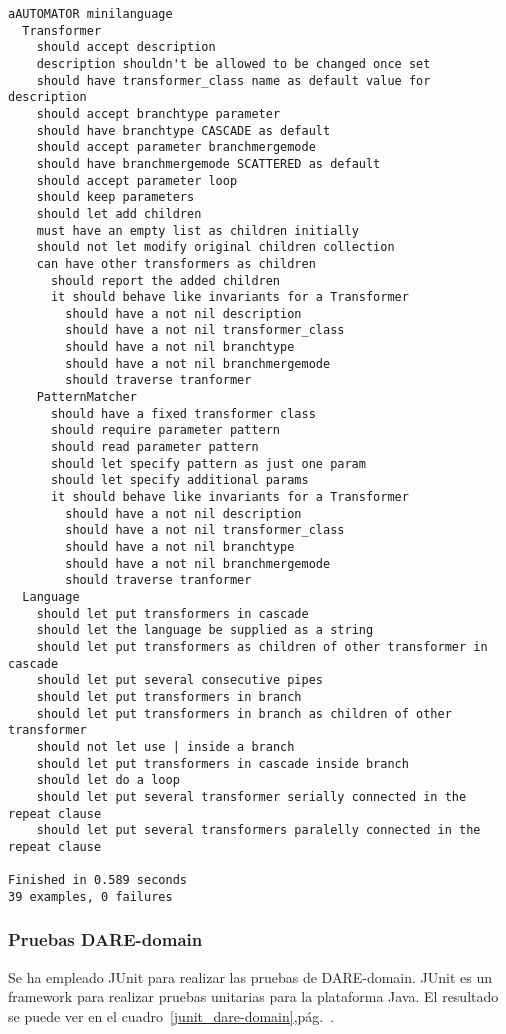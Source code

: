 \begin{table}[hbp]
\begingroup
    \fontsize{9pt}{11pt}\selectfont
\begin{verbatim}
aAUTOMATOR minilanguage
  Transformer
    should accept description
    description shouldn't be allowed to be changed once set
    should have transformer_class name as default value for description
    should accept branchtype parameter
    should have branchtype CASCADE as default
    should accept parameter branchmergemode
    should have branchmergemode SCATTERED as default
    should accept parameter loop
    should keep parameters
    should let add children
    must have an empty list as children initially
    should not let modify original children collection
    can have other transformers as children
      should report the added children
      it should behave like invariants for a Transformer
        should have a not nil description
        should have a not nil transformer_class
        should have a not nil branchtype
        should have a not nil branchmergemode
        should traverse tranformer
    PatternMatcher
      should have a fixed transformer class
      should require parameter pattern
      should read parameter pattern
      should let specify pattern as just one param
      should let specify additional params
      it should behave like invariants for a Transformer
        should have a not nil description
        should have a not nil transformer_class
        should have a not nil branchtype
        should have a not nil branchmergemode
        should traverse tranformer
  Language
    should let put transformers in cascade
    should let the language be supplied as a string
    should let put transformers as children of other transformer in cascade
    should let put several consecutive pipes
    should let put transformers in branch
    should let put transformers in branch as children of other transformer
    should not let use | inside a branch
    should let put transformers in cascade inside branch
    should let do a loop
    should let put several transformer serially connected in the repeat clause
    should let put several transformers paralelly connected in the repeat clause

Finished in 0.589 seconds
39 examples, 0 failures
\end{verbatim}
\endgroup
\caption{RSpec Tests para minilenguaje}
\label{rspec_tests}
\end{table}

\subsubsection{Pruebas DARE-domain}
Se ha empleado JUnit\cite{JUNIT} para realizar las pruebas de
DARE-domain. JUnit es un framework para realizar pruebas unitarias
para la plataforma Java. El resultado se puede ver en el
cuadro~\ref{junit_dare-domain},pág.~\pageref{junit_dare-domain}.

